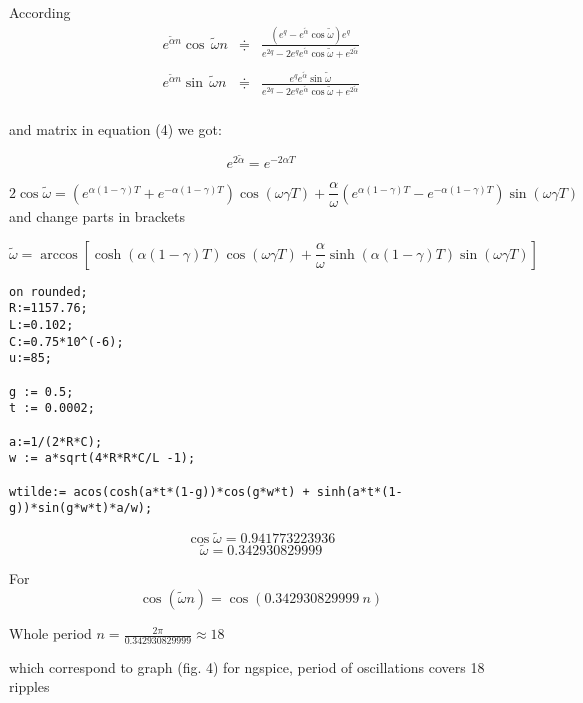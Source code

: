 \documentclass[11pt]{article}
\begin{document}
According
$$
\begin{array}{lll}
e^{\widetilde\alpha n} \cos\,\widetilde\omega n
&\doteqdot& \frac{\displaystyle(e^q - e^{\widetilde\alpha}\cos\widetilde\omega)e^q}
{\displaystyle e^{2q} - 2e^qe^{\widetilde\alpha}\cos\widetilde\omega + e^{2\widetilde\alpha}}\\
\\
e^{\widetilde\alpha n} \sin\,\widetilde\omega n&
\doteqdot& \frac{\displaystyle e^qe^{\widetilde\alpha}\sin\widetilde\omega}
{\displaystyle e^{2q} - 2e^qe^{\widetilde\alpha}\cos\widetilde\omega + e^{2\widetilde\alpha}}\\
\end{array}
$$

and matrix in equation (4) we got:

$$
e^{2\widetilde\alpha} = e^{-2\alpha T}
$$

$$
2\cos\widetilde\omega = 
\left(e^{\alpha (1-\gamma)T} + e^{-\alpha (1-\gamma)T}\right)\cos(\omega \gamma T) + 
\frac{\alpha}{\omega}\left(e^{\alpha (1-\gamma)T} - e^{-\alpha (1-\gamma)T}\right)\sin(\omega \gamma T)
$$
and change parts in brackets

$$
\widetilde\omega = \arccos\left[\cosh\left(\alpha(1-\gamma)T\right)
\cos(\omega\gamma T) +
\frac{\alpha}{\omega}
\sinh\left(\alpha(1-\gamma)T\right)
\sin(\omega\gamma T)
\right]
$$

\begin{verbatim}
on rounded;
R:=1157.76;
L:=0.102;
C:=0.75*10^(-6);
u:=85;

g := 0.5;
t := 0.0002;

a:=1/(2*R*C);
w := a*sqrt(4*R*R*C/L -1);

wtilde:= acos(cosh(a*t*(1-g))*cos(g*w*t) + sinh(a*t*(1-g))*sin(g*w*t)*a/w);
\end{verbatim}

$$
\cos\widetilde\omega = 0.941773223936
$$
$$
\widetilde\omega = 0.342930829999
$$

For 
$$
\cos(\widetilde\omega n) = \cos(0.342930829999\: n)
$$

Whole period $n= \frac{2\pi}{0.342930829999} \approx 18$

which correspond to graph (fig. 4) for ngspice,
period of oscillations covers 18 ripples 
\end{document}

